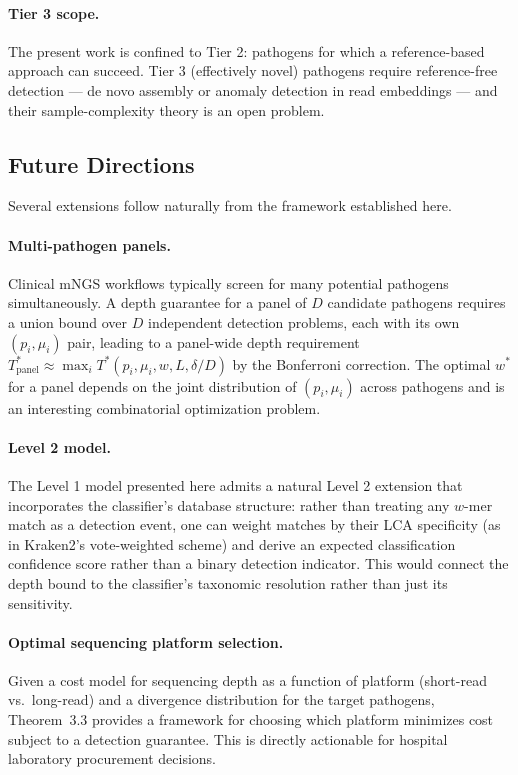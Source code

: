 \documentclass[12pt]{article}
\theoremstyle{definition}
\theoremstyle{plain}
\begin{document}
\paragraph{Tier 3 scope.} The present work is confined to Tier 2: pathogens
for which a reference-based approach can succeed. Tier 3 (effectively novel)
pathogens require reference-free detection --- de novo assembly or anomaly
detection in read embeddings --- and their sample-complexity theory is an
open problem.

\subsection{Future Directions}

Several extensions follow naturally from the framework established here.

\paragraph{Multi-pathogen panels.} Clinical mNGS workflows typically screen
for many potential pathogens simultaneously. A depth guarantee for a panel of
$D$ candidate pathogens requires a union bound over $D$ independent
detection problems, each with its own $(p_i,\mu_i)$ pair, leading to a
panel-wide depth requirement
$T^{*}_{\mathrm{panel}}\approx\max_i T^{*}(p_i,\mu_i,w,L,\delta/D)$ by the
Bonferroni correction. The optimal $w^{*}$ for a panel depends on the joint
distribution of $(p_i,\mu_i)$ across pathogens and is an interesting
combinatorial optimization problem.

\paragraph{Level 2 model.} The Level 1 model presented here admits a natural
Level 2 extension that incorporates the classifier's database structure:
rather than treating any $w$-mer match as a detection event, one can weight
matches by their LCA specificity (as in Kraken2's vote-weighted scheme) and
derive an expected classification confidence score rather than a binary
detection indicator. This would connect the depth bound to the classifier's
taxonomic resolution rather than just its sensitivity.

\paragraph{Optimal sequencing platform selection.} Given a cost model for
sequencing depth as a function of platform (short-read vs.\ long-read) and a
divergence distribution for the target pathogens, Theorem~3.3 provides a
framework for choosing which platform minimizes cost subject to a detection
guarantee. This is directly actionable for hospital laboratory procurement
decisions.
\end{document}
